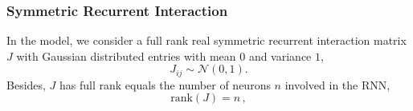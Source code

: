 \documentclass[11pt]{article}
\begin{document}
	\subsubsection{Symmetric Recurrent Interaction} \label{sec:symmetric_recurrent_interaction}
	In the model, we consider a full rank real symmetric recurrent interaction matrix $J$ with Gaussian distributed entries with mean $0$ and variance $1$,
		\begin{equation} \label{eq:gaussian_distribution}
			{J_{ij}} \sim \mathcal{N}(0, 1).
		\end{equation}
	Besides, $J$ has full rank equals the number of neurons $n$ involved in the RNN, 
		\begin{equation}
			\text{rank} (J) = n \, , 
		\end{equation}
\end{document}
